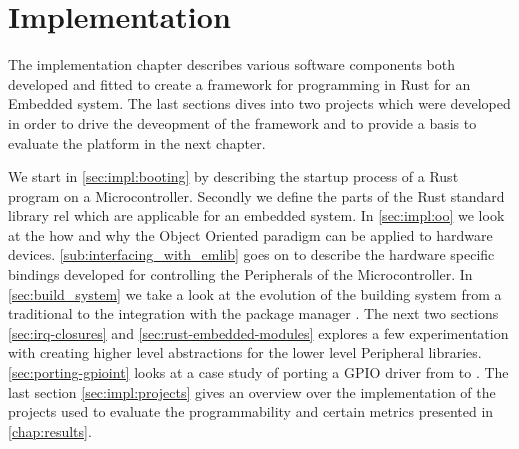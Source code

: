
\chapter{Implementation}
\label{chap:impl}

The implementation chapter describes various software components both developed and fitted to create a framework for programming in Rust for an Embedded system.
The last sections dives into two projects which were developed in order to drive the deveopment of the framework and to provide a basis to evaluate the platform in the next chapter.

We start in \autoref{sec:impl:booting} by describing the startup process of a Rust program on a Microcontroller.
Secondly we define the parts of the Rust standard library \gls{rel} which are applicable for an embedded system.
In \autoref{sec:impl:oo} we look at the how and why the Object Oriented paradigm can be applied to hardware devices.
\autoref{sub:interfacing_with_emlib} goes on to describe the hardware specific bindings developed for controlling the Peripherals of the Microcontroller.
In \autoref{sec:build_system} we take a look at the evolution of the building system from a traditional  to the integration with the {\rust} package manager {\cargo}.
The next two sections \autoref{sec:irq-closures} and \autoref{sec:rust-embedded-modules} explores a few experimentation with creating higher level abstractions for the lower level Peripheral libraries.
\autoref{sec:porting-gpioint} looks at a case study of porting a GPIO driver from {\C} to {\rust}.
The last section \autoref{sec:impl:projects} gives an overview over the implementation of the projects used to evaluate the programmability and certain metrics presented in \autoref{chap:results}.










